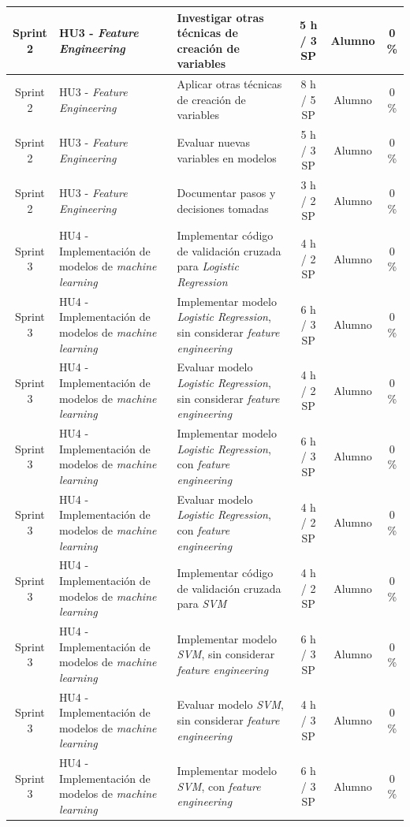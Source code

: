 \documentclass[
11pt, %
]{charter}
\begin{document}
\begin{xltabular}{\linewidth}{@{}|c|X|X|c|c|c|@{}}
Sprint 2 & HU3 - \textit{Feature Engineering}  & Investigar otras técnicas de creación de variables & 5 h / 3 SP & Alumno & 0 \% \\ \hline
Sprint 2 & HU3 - \textit{Feature Engineering}  & Aplicar otras técnicas de creación de variables  & 8 h / 5 SP & Alumno & 0 \%\\ \hline
Sprint 2 & HU3 - \textit{Feature Engineering}  & Evaluar nuevas variables en modelos  & 5 h / 3 SP & Alumno & 0 \%\\ \hline
Sprint 2 & HU3 - \textit{Feature Engineering}  & Documentar pasos y decisiones tomadas  & 3 h / 2 SP & Alumno & 0 \%\\ \hline
Sprint 3 & HU4 - Implementación de modelos de \textit{machine learning} & Implementar código de validación cruzada para \textit{Logistic Regression}  & 4 h / 2 SP & Alumno & 0 \% \\ \hline
Sprint 3 & HU4 - Implementación de modelos de \textit{machine learning} & Implementar modelo \textit{Logistic Regression}, sin considerar \textit{feature engineering} & 6 h / 3 SP & Alumno & 0 \%\\ \hline
Sprint 3 & HU4 - Implementación de modelos de \textit{machine learning} & Evaluar modelo \textit{Logistic Regression}, sin considerar \textit{feature engineering}  & 4 h / 2 SP & Alumno & 0 \%\\ \hline
Sprint 3 & HU4 - Implementación de modelos de \textit{machine learning} & Implementar modelo \textit{Logistic Regression}, con \textit{feature engineering}  & 6 h / 3 SP & Alumno & 0 \%\\ \hline
Sprint 3 & HU4 - Implementación de modelos de \textit{machine learning} & Evaluar modelo \textit{Logistic Regression}, con \textit{feature engineering}  & 4 h / 2 SP & Alumno & 0 \%\\ \hline
Sprint 3 & HU4 - Implementación de modelos de \textit{machine learning} & Implementar código de validación cruzada para \textit{SVM}  & 4 h / 2 SP & Alumno & 0 \%\\ \hline
Sprint 3 & HU4 - Implementación de modelos de \textit{machine learning} & Implementar modelo \textit{SVM}, sin considerar \textit{feature engineering}  & 6 h / 3 SP & Alumno & 0 \%\\ \hline
Sprint 3 & HU4 - Implementación de modelos de \textit{machine learning} & Evaluar modelo \textit{SVM}, sin considerar \textit{feature engineering}  & 4 h / 3 SP & Alumno & 0 \%\\ \hline
Sprint 3 & HU4 - Implementación de modelos de \textit{machine learning} & Implementar modelo \textit{SVM}, con \textit{feature engineering}  & 6 h / 3 SP & Alumno & 0 \%\\ \hline

\end{xltabular}
\end{document}
